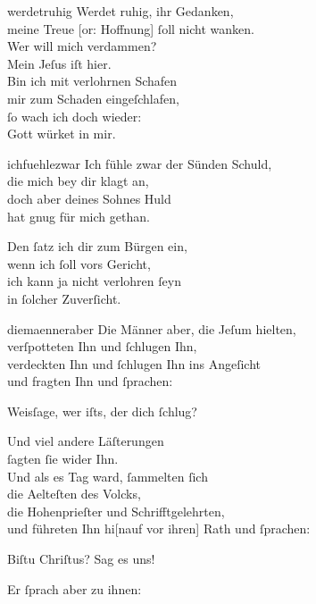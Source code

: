 \documentclass[tocstyle=ref-genre]{ees}
\begin{document}
{\begin{movement}{werdetruhig}
  \voice[Petrus]
  Werdet ruhig, ihr Gedanken,\\
  meine Treue [or: Hoffnung] ſoll nicht wanken.\\
  Wer will mich verdammen?\\
  Mein Jeſus iſt hier.\\
  Bin ich mit verlohrnen Schafen\\
  mir zum Schaden eingeſchlafen,\\
  ſo wach ich doch wieder:\\
  Gott würket in mir.
\end{movement}

\begin{movement}{ichfuehlezwar}
  \voice[Chor]
  Ich fühle zwar der Sünden Schuld,\\
  die mich bey dir klagt an,\\
  doch aber deines Sohnes Huld\\
  hat gnug für mich gethan.

  Den ſatz ich dir zum Bürgen ein,\\
  wenn ich ſoll vors Gericht,\\
  ich kann ja nicht verlohren ſeyn\\
  in ſolcher Zuverſicht.
\end{movement}

\begin{movement}{diemaenneraber}
  \voice[Evangelist]
  Die Männer aber, die Jeſum hielten,\\
  verſpotteten Ihn und ſchlugen Ihn,\\
  verdeckten Ihn und ſchlugen Ihn ins Angeſicht\\
  und fragten Ihn und ſprachen:

  \voice[Chor]
  Weisſage, wer iſts, der dich ſchlug?

  \voice[Evangelist]
  Und viel andere Läſterungen\\
  ſagten ſie wider Ihn.\\
  Und als es Tag ward, ſammelten ſich\\
  die Aelteſten des Volcks,\\
  die Hohenprieſter und Schrifftgelehrten,\\
  und führeten Ihn hi[nauf vor ihren] Rath und ſprachen:

  \voice[Chor]
  Biſtu Chriſtus? Sag es uns!

  \voice[Evangelist]
  Er ſprach aber zu ihnen:


\end{movement}}
\end{document}
